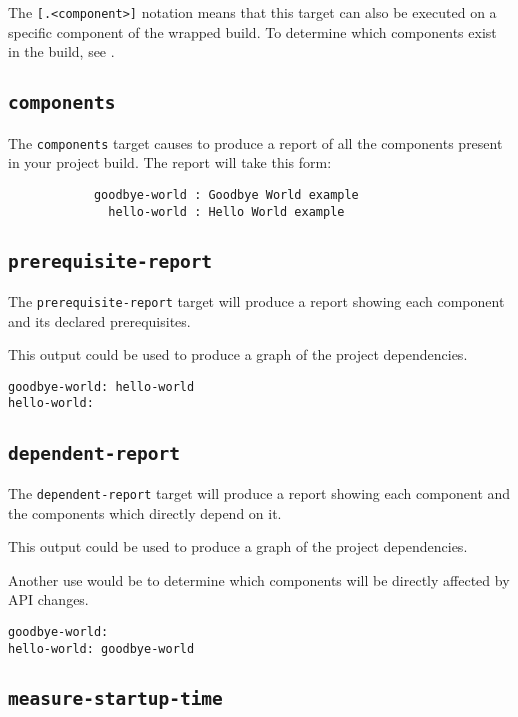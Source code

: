 The \texttt{[.<component>]} notation means that this target can also
be executed on a specific component of the wrapped build.  To
determine which components exist in the build, see
.

\subsection{\texttt{components}}\label{lmsbw:target:components}

The \texttt{components} target causes \lmsbw to produce a report of all
the components present in your project build.  The report will take
this form:

\begin{verbatim}
            goodbye-world : Goodbye World example
              hello-world : Hello World example
\end{verbatim}

\subsection{\texttt{prerequisite-report}}

The \texttt{prerequisite-report} target will produce a report showing
each component and its declared prerequisites.

This output could be used to produce a graph of the project dependencies.

\begin{verbatim}
goodbye-world: hello-world
hello-world:
\end{verbatim}

\subsection{\texttt{dependent-report}}

The \texttt{dependent-report} target will produce a report showing
each component and the components which directly depend on it.

This output could be used to produce a graph of the project
dependencies.

Another use would be to determine which components will be directly
affected by API changes.

\begin{verbatim}
goodbye-world:
hello-world: goodbye-world
\end{verbatim}

\subsection{\texttt{measure-startup-time}}\label{usinglmsbw:measure-startup-time}

